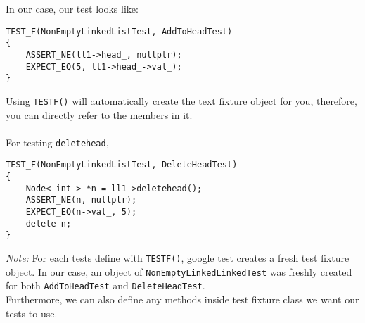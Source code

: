 In our case, our test looks like:
\begin{Verbatim}[frame=single]
TEST_F(NonEmptyLinkedListTest, AddToHeadTest)
{
    ASSERT_NE(ll1->head_, nullptr);
    EXPECT_EQ(5, ll1->head_->val_);
}
\end{Verbatim}
Using \texttt{TEST\textunderscore F()} will automatically create the text
fixture object for you, therefore, you can directly refer to the members in it.
\\ \\
For testing \texttt{deletehead},
\begin{Verbatim}[frame=single]
TEST_F(NonEmptyLinkedListTest, DeleteHeadTest)
{
    Node< int > *n = ll1->deletehead();
    ASSERT_NE(n, nullptr);
    EXPECT_EQ(n->val_, 5);
    delete n;
}
\end{Verbatim}

\emph{Note: }For each tests define with \texttt{TEST\textunderscore F()},
google test creates a fresh test fixture object. In our case, an object of
\texttt{NonEmptyLinkedLinkedTest} was freshly created for both
\texttt{AddToHeadTest} and \texttt{DeleteHeadTest}. \\

Furthermore, we can also define any methods inside test fixture class we want our tests to use. \\

\newpage


